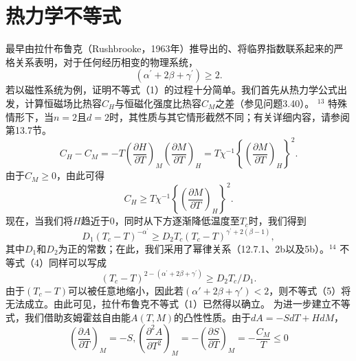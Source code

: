 \section{热力学不等式}\label{ux70edux529bux5b66ux4e0dux7b49ux5f0f}
最早由拉什布鲁克（Rushbrooke，1963年）推导出的、将临界指数联系起来的严格关系表明，对于任何经历相变的物理系统，
\begin{equation}\tag{12.8.1}\label{eq:12.8.1}
( \alpha ^{\prime} + 2 \beta + \gamma ^{\prime} ) \geq 2 .
\end{equation}
若以磁性系统为例，证明不等式（1）的过程十分简单。我们首先从热力学公式出发，计算恒磁场比热容\(C_H\)与恒磁化强度比热容\(C_M\)之差（参见问题3.40）。
\(^{13}\) 特殊情形下，当\(n=2\)且\(d=2\)时，其性质与其它情形截然不同；有关详细内容，请参阅第13.7节。
\begin{equation}\tag{12.8.2}\label{eq:12.8.2}
C _ { H } - C _ { M } = - T \left( \frac { \partial H } { \partial T } \right) _ { M } \left( \frac { \partial M } { \partial T } \right) _ { H } = T \chi ^{- 1} \left\{ \left( \frac { \partial M } { \partial T } \right) _ { H } \right\} ^{2} .
\end{equation}
由于\(C_{M} \geq 0\)，由此可得
\begin{equation}\tag{12.8.3}\label{eq:12.8.3}
C _ { H } \geq T \chi ^{- 1} \left\{ \left( \frac { \partial M } { \partial T } \right) _ { H } \right\} ^{2} .
\end{equation}
现在，当我们将\(H\)趋近于0，同时从下方逐渐降低温度至\(T_c\)时，我们得到
\begin{equation}\tag{12.8.4}\label{eq:12.8.4}
D _ { 1 } ( T _ { c } - T ) ^{- \alpha ^ { \prime} } \geq D _ { 2 } T _ { c } ( T _ { c } - T ) ^{\gamma ^ { \prime} + 2 ( \beta - 1 ) } ,
\end{equation}
其中\(D_{1}\)和\(D_{2}\)为正的常数；在此，我们采用了幂律关系（12.7.1、2b以及5b）。\(^{14}\) 不等式（4）同样可以写成
\begin{equation}\tag{12.8.5}\label{eq:12.8.5}
( T _ { c } - T ) ^{2 - ( \alpha ^ { \prime} + 2 \beta + \gamma ^{\prime} ) } \geq D _ { 2 } T _ { c } / D _ { 1 } .
\end{equation}
由于\((T_c - T)\)可以被任意地缩小，因此若\((\alpha' + 2\beta + \gamma') < 2\)，则不等式（5）将无法成立。由此可见，拉什布鲁克不等式（1）已然得以确立。
为进一步建立不等式，我们借助亥姆霍兹自由能\(A(T,M)\)的凸性性质。由于\(dA = -SdT + HdM\)，
\begin{equation}\tag{12.8.6}\label{eq:12.8.6}
\left( \frac { \partial A } { \partial T } \right) _ { M } = - S ,  \left( \frac { \partial ^{2} A } { \partial T ^{2} } \right) _ { M } = - \left( \frac { \partial S } { \partial T } \right) _ { M } = - \frac { C _ { M } } { T } \leq 0
\end{equation}
